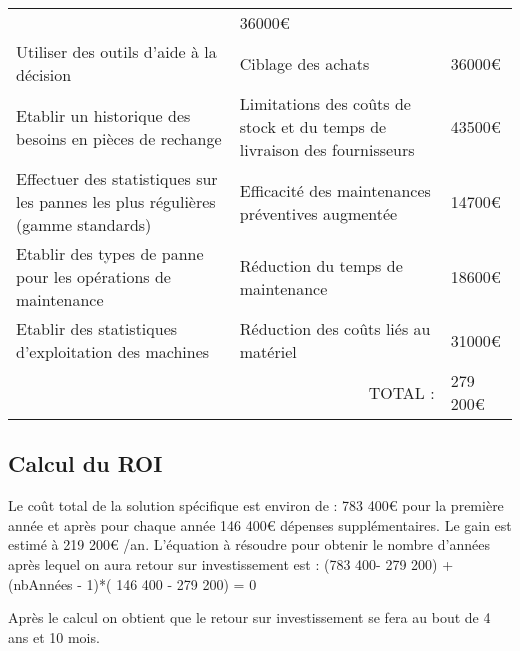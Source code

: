 \begin{description}
\begin{tabular}{|p{7cm}|p{5cm}|p{2cm}|}
                                                          &  36000€ \\ \cline{1-2}  
Utiliser des outils d'aide à la décision
                                  & Ciblage des achats
                                                          &  36000€ \\ \cline{1-2} 
Etablir un historique des besoins en pièces de rechange
                                  & Limitations des coûts de stock et du temps de livraison des fournisseurs
                                                          &  43500€ \\ \cline{1-2} 
Effectuer des statistiques sur les pannes les plus régulières (gamme standards)
                                  & Efficacité des maintenances préventives augmentée
                                                          &   14700€\\ \cline{1-2}         
Etablir des types de panne pour les opérations de maintenance
                                  & Réduction du temps de maintenance
                                                          &   18600€\\ \cline{1-2}

Etablir des statistiques d'exploitation des machines
                                  & Réduction des coûts liés au matériel
                                                          &  31000€ \\ \hline  
\multicolumn{2}{|r|}{TOTAL :} & 279 200€ \\ \hline                                                                                                                                                                                                                      
      
\end{tabular}
        
\subsection{Calcul du ROI}

Le coût total de la solution spécifique est environ de : 783 400€ pour la première année et après pour chaque année 146 400€ dépenses supplémentaires. Le gain est estimé à 219 200€ /an. L'équation à résoudre pour obtenir le nombre
d'années après lequel on aura retour sur investissement est : (783 400- 279 200) + (nbAnnées - 1)*( 146 400 - 279 200) = 0

Après le calcul on obtient que le retour sur investissement se fera au bout de 4 ans et 10 mois.



\end{description}
